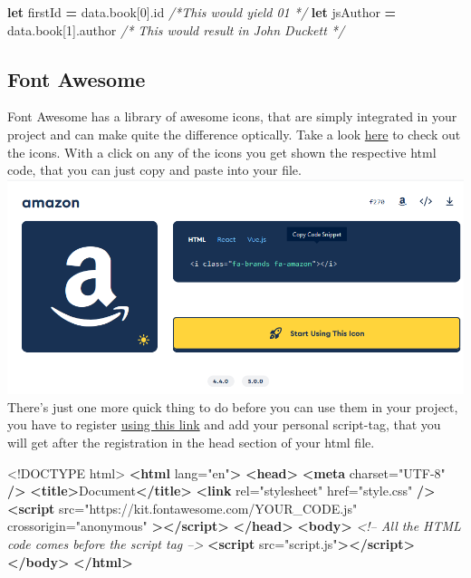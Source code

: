 \documentclass[
]{article}
\newenvironment{Shaded}{\begin{snugshade}}{\end{snugshade}}
\newcommand{\AttributeTok}[1]{\textcolor[rgb]{0.77,0.63,0.00}{#1}}
\newcommand{\CommentTok}[1]{\textcolor[rgb]{0.56,0.35,0.01}{\textit{#1}}}
\newcommand{\DataTypeTok}[1]{\textcolor[rgb]{0.13,0.29,0.53}{#1}}
\newcommand{\DecValTok}[1]{\textcolor[rgb]{0.00,0.00,0.81}{#1}}
\newcommand{\KeywordTok}[1]{\textcolor[rgb]{0.13,0.29,0.53}{\textbf{#1}}}
\newcommand{\NormalTok}[1]{#1}
\newcommand{\OperatorTok}[1]{\textcolor[rgb]{0.81,0.36,0.00}{\textbf{#1}}}
\newcommand{\OtherTok}[1]{\textcolor[rgb]{0.56,0.35,0.01}{#1}}
\newcommand{\StringTok}[1]{\textcolor[rgb]{0.31,0.60,0.02}{#1}}
\newcommand{\VariableTok}[1]{\textcolor[rgb]{0.00,0.00,0.00}{#1}}
\begin{document}
\begin{Shaded}
\begin{Highlighting}[]
\KeywordTok{let}\NormalTok{ firstId }\OperatorTok{=} \VariableTok{data}\NormalTok{.}\AttributeTok{book}\NormalTok{[}\DecValTok{0}\NormalTok{].}\AttributeTok{id} \CommentTok{/*This would yield 01 */}
\KeywordTok{let}\NormalTok{ jsAuthor }\OperatorTok{=} \VariableTok{data}\NormalTok{.}\AttributeTok{book}\NormalTok{[}\DecValTok{1}\NormalTok{].}\AttributeTok{author} \CommentTok{/* This would result in John Duckett */}  
\end{Highlighting}
\end{Shaded}

\hypertarget{font-awesome}{%
\subsection{Font Awesome}\label{font-awesome}}

Font Awesome has a library of awesome icons, that are simply integrated in your project and can make quite the difference optically.
Take a look \href{https://fontawesome.com/search?m=free}{here} to check out the icons. With a click on any of the icons you get shown the respective html code, that you can just copy and paste into your file.
\includegraphics{docs/assets/font-awesome.png}
There's just one more quick thing to do before you can use them in your project, you have to register \href{https://fontawesome.com/v6/docs/web/setup/get-started}{using this link} and add your personal script-tag, that you will get after the registration in the head section of your html file.

\begin{Shaded}
\begin{Highlighting}[]
\DataTypeTok{<!DOCTYPE }\NormalTok{html}\DataTypeTok{>}
\KeywordTok{<html}\OtherTok{ lang=}\StringTok{"en"}\KeywordTok{>}
  \KeywordTok{<head>}
    \KeywordTok{<meta}\OtherTok{ charset=}\StringTok{"UTF-8"} \KeywordTok{/>}
    \KeywordTok{<title>}\NormalTok{Document}\KeywordTok{</title>}
    \KeywordTok{<link}\OtherTok{ rel=}\StringTok{"stylesheet"}\OtherTok{ href=}\StringTok{"style.css"} \KeywordTok{/>}
    \KeywordTok{<script}
\OtherTok{      src=}\StringTok{"https://kit.fontawesome.com/YOUR_CODE.js"}
\OtherTok{      crossorigin=}\StringTok{"anonymous"}
    \KeywordTok{></script>}
  \KeywordTok{</head>}
  \KeywordTok{<body>}
    \CommentTok{<!-- All the HTML code comes before the script tag -->}
    \KeywordTok{<script}\OtherTok{ src=}\StringTok{"script.js"}\KeywordTok{></script>}
  \KeywordTok{</body>}
\KeywordTok{</html>}
\end{Highlighting}
\end{Shaded}
\end{document}
